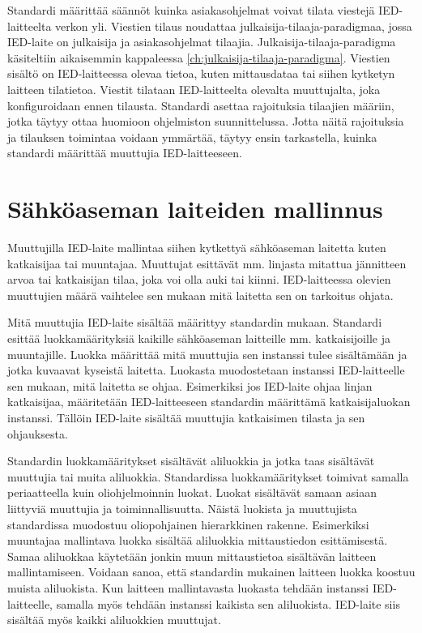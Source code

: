 Standardi määrittää säännöt kuinka asiakasohjelmat voivat tilata viestejä IED-laitteelta verkon yli. Viestien tilaus noudattaa julkaisija-tilaaja-paradigmaa, jossa IED-laite on julkaisija ja asiakasohjelmat tilaajia. Julkaisija-tilaaja-paradigma käsiteltiin aikaisemmin kappaleessa \ref{ch:julkaisija-tilaaja-paradigma}. Viestien sisältö on IED-laitteessa olevaa tietoa, kuten mittausdataa tai siihen kytketyn laitteen tilatietoa. Viestit tilataan IED-laitteelta olevalta muuttujalta, joka konfiguroidaan ennen tilausta. Standardi asettaa rajoituksia tilaajien määriin, jotka täytyy ottaa huomioon ohjelmiston suunnittelussa. Jotta näitä rajoituksia ja tilauksen toimintaa voidaan ymmärtää, täytyy ensin tarkastella, kuinka standardi määrittää muuttujia IED-laitteeseen.


\section{Sähköaseman laiteiden mallinnus}
Muuttujilla IED-laite mallintaa siihen kytkettyä sähköaseman laitetta kuten katkaisijaa tai muuntajaa. Muuttujat esittävät mm. linjasta mitattua jännitteen arvoa tai katkaisijan tilaa, joka voi olla auki tai kiinni. IED-laitteessa olevien muuttujien määrä vaihtelee sen mukaan mitä laitetta sen on tarkoitus ohjata.

Mitä muuttujia IED-laite sisältää määrittyy standardin mukaan. Standardi esittää luokkamäärityksiä kaikille sähköaseman laitteille mm. katkaisijoille ja muuntajille. Luokka määrittää mitä muuttujia sen instanssi tulee sisältämään ja jotka kuvaavat kyseistä laitetta. Luokasta muodostetaan instanssi IED-laitteelle sen mukaan, mitä laitetta se ohjaa. Esimerkiksi jos IED-laite ohjaa linjan katkaisijaa, määritetään IED-laitteeseen standardin määrittämä katkaisijaluokan instanssi. Tällöin IED-laite sisältää muuttujia katkaisimen tilasta ja sen ohjauksesta.

Standardin luokkamääritykset sisältävät aliluokkia ja jotka taas sisältävät muuttujia tai muita aliluokkia. Standardissa luokkamääritykset toimivat samalla periaatteella kuin oliohjelmoinnin luokat. Luokat sisältävät samaan asiaan liittyviä muuttujia ja toiminnallisuutta. Näistä luokista ja muuttujista standardissa muodostuu oliopohjainen hierarkkinen rakenne. Esimerkiksi muuntajaa mallintava luokka sisältää aliluokkia mittaustiedon esittämisestä. Samaa aliluokkaa käytetään jonkin muun mittaustietoa sisältävän laitteen mallintamiseen. Voidaan sanoa, että standardin mukainen laitteen luokka koostuu muista aliluokista. Kun laitteen mallintavasta luokasta tehdään instanssi IED-laitteelle, samalla myös tehdään instanssi kaikista sen aliluokista. IED-laite siis sisältää myös kaikki aliluokkien muuttujat.

